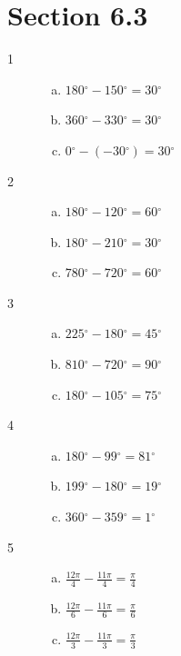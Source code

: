\documentclass{exam}
\newcommand{\dg}{\ensuremath{^\circ}}
\begin{document}
  \ifprintanswers

  \pagebreak

    \section{Section 6.3}

    \begin{description}

      \item[1] 
        \begin{enumerate}[(a)]
          \item $180 \dg - 150 \dg = \boxed{ 30 \dg }$
          \item $360 \dg - 330 \dg = \boxed{ 30 \dg }$
          \item $0 \dg - (-30 \dg) = \boxed{ 30 \dg }$
        \end{enumerate}

      \item[2] 
        \begin{enumerate}[(a)]
          \item $180 \dg - 120 \dg = \boxed{ 60 \dg }$
          \item $180 \dg - 210 \dg = \boxed{ 30 \dg }$
          \item $780 \dg - 720 \dg = \boxed{ 60 \dg }$
        \end{enumerate}

      \item[3] 
        \begin{enumerate}[(a)]
          \item $225 \dg - 180 \dg = \boxed{ 45 \dg }$
          \item $810 \dg - 720 \dg = \boxed{ 90 \dg }$
          \item $180 \dg - 105 \dg = \boxed{ 75 \dg }$
        \end{enumerate}

      \item[4] 
        \begin{enumerate}[(a)]
          \item $180 \dg - 99 \dg = \boxed{ 81 \dg }$
          \item $199 \dg - 180 \dg = \boxed{ 19 \dg }$
          \item $360 \dg - 359 \dg = \boxed{ 1 \dg }$
        \end{enumerate}

      \item[5] 
        \begin{enumerate}[(a)]
          \item $\frac{12 \pi}{4} - \frac{11 \pi}{4} = \boxed{ \frac{\pi}{4} }$
          \item $\frac{12 \pi}{6} - \frac{11 \pi}{6} = \boxed{ \frac{\pi}{6} }$
          \item $\frac{12 \pi}{3} - \frac{11 \pi}{3} = \boxed{ \frac{\pi}{3} }$
        \end{enumerate}


\end{description}
\end{document}
